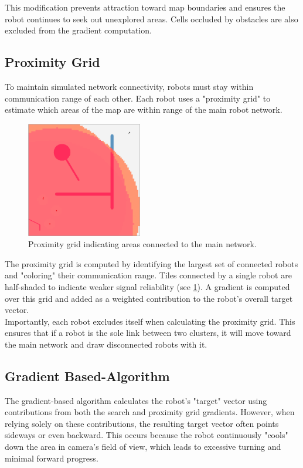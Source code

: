 This modification prevents attraction toward map boundaries and ensures the robot continues to seek out unexplored areas. Cells occluded by obstacles are also excluded from the gradient computation.


\subsection{Proximity Grid}
To maintain simulated network connectivity, robots must stay within communication range of each other. Each robot uses a "proximity grid" to estimate which areas of the map are within range of the main robot network.

\begin{figure}[H]
    \begin{center}
        \includegraphics[width=0.45\textwidth]{figures/screenshots/proximity-gradient.png}
    \end{center}
    \caption{Proximity grid indicating areas connected to the main network.}
    \label{fig:proximity-grid}
\end{figure}

The proximity grid is computed by identifying the largest set of connected robots and "coloring" their communication range. Tiles connected by a single robot are half-shaded to indicate weaker signal reliability (see \cref{fig:proximity-grid}). A gradient is computed over this grid and added as a weighted contribution to the robot’s overall target vector. \\

Importantly, each robot excludes itself when calculating the proximity grid. This ensures that if a robot is the sole link between two clusters, it will move toward the main network and draw disconnected robots with it. \\

\subsection{Gradient Based-Algorithm}
The gradient-based algorithm calculates the robot's "target" vector using contributions from both the search and proximity grid gradients. However, when relying solely on these contributions, the resulting target vector often points sideways or even backward. This occurs because the robot continuously "cools" down the area in camera's field of view, which leads to excessive turning and minimal forward progress. \\


